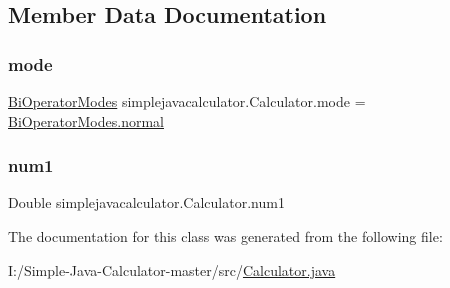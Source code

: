 \subsection{Member Data Documentation}
\mbox{\label{classsimplejavacalculator_1_1_calculator_af05f6e5dcee50285e3f758178b800c77}} 
\subsubsection{\texorpdfstring{mode}{mode}}
{\footnotesize\ttfamily \mbox{\hyperlink{enumsimplejavacalculator_1_1_calculator_1_1_bi_operator_modes}{Bi\+Operator\+Modes}} simplejavacalculator.\+Calculator.\+mode = \mbox{\hyperlink{enumsimplejavacalculator_1_1_calculator_1_1_bi_operator_modes_a56133d3ae106bb392daf0ef835b6068a}{Bi\+Operator\+Modes.\+normal}}\hspace{0.3cm}{\ttfamily [private]}}

\mbox{\label{classsimplejavacalculator_1_1_calculator_aa709e89fa67612cdd45eed743caa7523}} 
\subsubsection{\texorpdfstring{num1}{num1}}
{\footnotesize\ttfamily Double simplejavacalculator.\+Calculator.\+num1\hspace{0.3cm}{\ttfamily [private]}}



The documentation for this class was generated from the following file\+:\begin{DoxyCompactItemize}
\item 
I\+:/\+Simple-\/\+Java-\/\+Calculator-\/master/src/\mbox{\hyperlink{_calculator_8java}{Calculator.\+java}}\end{DoxyCompactItemize}
